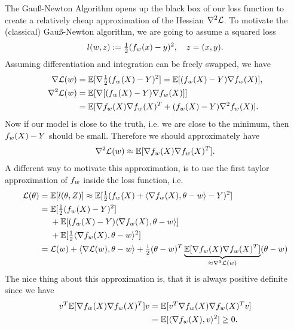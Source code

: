 The Gauß-Newton Algorithm opens up the black box of our loss function to create
a relatively cheap approximation of the Hessian \(\nabla^2\mathcal{L}\).
To motivate the (classical) Gauß-Newton algorithm, we are going to assume a
squared loss
\begin{align*}
	l(w, z) := \tfrac12(f_{w}(x) - y)^2, \quad z=(x,y).
\end{align*}
Assuming differentiation and integration can be freely swapped, we have
\begin{align}
	\label{eq: derivative gauss newton}
	\nabla\Loss(\weights)
	&= \E[\nabla\tfrac12(\model[\weights](X)-Y)^2]
	= \E[(\model[\weights](X)-Y)\nabla\model[\weights](X)],\\
	\label{eq: hessian gauss newton}
	\nabla^2\Loss(\weights)
	&=\E[\nabla[(\model[\weights](X)-Y)\nabla\model[\weights](X)]]\\
	\nonumber
	&=\E[\nabla\model(X)\nabla\model(X)^T + (\model(X)-Y)\nabla^2\model(X)].
\end{align}
Now if our model is close to the truth, i.e. we are close to the minimum, then
\(f_{w}(X)-Y\) should be small. Therefore we should approximately have
\begin{align*}
	\nabla^2\mathcal{L}(w) \approx \mathbb{E}[\nabla f_{w}(X)\nabla f_{w}(X)^T].
\end{align*}
A different way to motivate this approximation, is to use the first taylor
approximation of \(f_{w}\) inside the loss function, i.e.
\begin{align*}
	\mathcal{L}(\theta)
	&= \mathbb{E}[l(\theta, Z)]
	\approx \mathbb{E}[\tfrac12(f_{w}(X) + \langle \nabla f_{w}(X), \theta-w\rangle - Y)^2]\\
	&= \begin{aligned}[t]
		&\mathbb{E}[\tfrac12(f_{w}(X)-Y)^2]\\
		&+ \mathbb{E}[(f_{w}(X)-Y)\langle \nabla f_{w}(X), \theta-w\rangle]\\
		&+ \mathbb{E}[\tfrac12\langle \nabla f_{w}(X), \theta-w\rangle^2]
	\end{aligned}\\
	&= \mathcal{L}(w) + \langle\nabla\mathcal{L}(w), \theta-w\rangle
	+ \tfrac12 (\theta-w)^T
	\underbrace{\mathbb{E}[\nabla f_{w}(X)\nabla f_{w}(X)^T]}_{\approx\nabla^2\mathcal{L}(w)}
	(\theta-w)
\end{align*}
The nice thing about this approximation is, that it is always positive definite
since we have
\begin{align*}
	 v^T \mathbb{E}[\nabla f_{w}(X)\nabla f_{w}(X)^T] v
	&= \mathbb{E}[ v^T\nabla f_{w}(X) \nabla f_{w}(X)^T v]\\
	&= \mathbb{E}[\langle \nabla f_{w}(X), v\rangle^2]\ge 0.
\end{align*}


